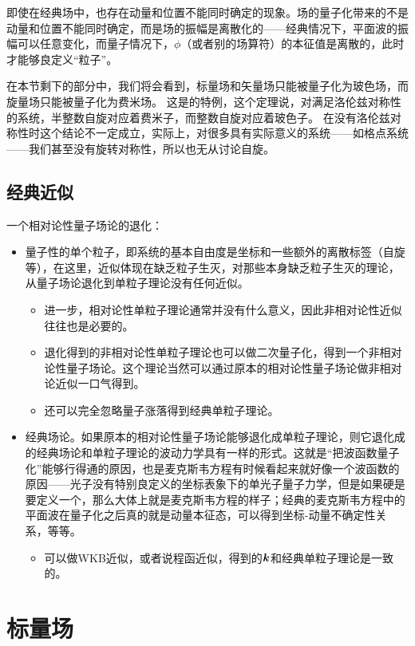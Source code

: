 即使在经典场中，也存在动量和位置不能同时确定的现象。场的量子化带来的不是动量和位置不能同时确定，而是场的振幅是离散化的——经典情况下，平面波的振幅可以任意变化，而量子情况下，${\phi}$（或者别的场算符）的本征值是离散的，此时才能够良定义“粒子”。

在本节剩下的部分中，我们将会看到，标量场和矢量场只能被量子化为玻色场，而旋量场只能被量子化为费米场。
这是的特例，这个定理说，对满足洛伦兹对称性的系统，半整数自旋对应着费米子，而整数自旋对应着玻色子。
在没有洛伦兹对称性时这个结论不一定成立，实际上，对很多具有实际意义的系统——如格点系统——我们甚至没有旋转对称性，所以也无从讨论自旋。

\subsection{经典近似}

一个相对论性量子场论的退化：
\begin{itemize}
    \item 量子性的单个粒子，即系统的基本自由度是坐标和一些额外的离散标签（自旋等），在这里，近似体现在缺乏粒子生灭，对那些本身缺乏粒子生灭的理论，从量子场论退化到单粒子理论没有任何近似。
    \begin{itemize}
        \item 进一步，相对论性单粒子理论通常并没有什么意义，因此非相对论性近似往往也是必要的。
        \item 退化得到的非相对论性单粒子理论也可以做二次量子化，得到一个非相对论性量子场论。这个理论当然可以通过原本的相对论性量子场论做非相对论近似一口气得到。
        \item 还可以完全忽略量子涨落得到经典单粒子理论。
    \end{itemize}
    \item 经典场论。如果原本的相对论性量子场论能够退化成单粒子理论，则它退化成的经典场论和单粒子理论的波动力学具有一样的形式。这就是“把波函数量子化”能够行得通的原因，也是麦克斯韦方程有时候看起来就好像一个波函数的原因——光子没有特别良定义的坐标表象下的单光子量子力学，但是如果硬是要定义一个，那么大体上就是麦克斯韦方程的样子；经典的麦克斯韦方程中的平面波在量子化之后真的就是动量本征态，可以得到坐标-动量不确定性关系，等等。
    \begin{itemize}
        \item 可以做WKB近似，或者说程函近似，得到的$\vb*{k}$和经典单粒子理论是一致的。
    \end{itemize}
\end{itemize}

\section{标量场}

